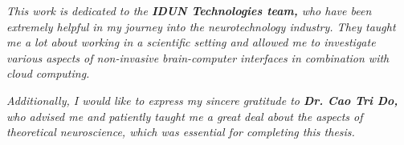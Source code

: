 \begin{dedication}

    \textit{This work is dedicated to the \textbf{IDUN Technologies team,} who have been extremely helpful in my journey into the neurotechnology industry. They taught me a lot about working in a scientific setting and allowed me to investigate various aspects of non-invasive brain-\break computer interfaces in combination with cloud computing.}

    \hfill \break

    \textit{Additionally, I would like to express my sincere gratitude to \textbf{Dr. Cao Tri Do,} who advised me and patiently taught me a great deal about the aspects of theoretical neuroscience, \break which was essential for completing this thesis.}

\end{dedication}
